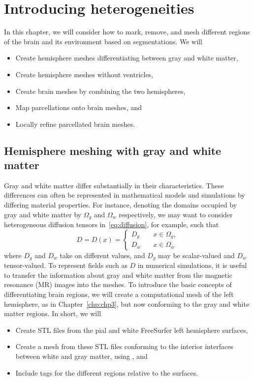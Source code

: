 \chapter{Introducing heterogeneities}
\label{chp:chp4}

In this chapter, we will consider how to mark, remove, and mesh
different regions of the brain and its environment based on
{\freesurfer} segmentations. We will
\begin{itemize}
\item
  Create hemisphere meshes differentiating between gray and white matter,
\item
  Create hemisphere meshes without ventricles,
\item
  Create brain meshes by combining the two hemispheres,
\item
  Map parcellations onto brain meshes, and
\item
  Locally refine parcellated brain meshes.
\end{itemize}

\section{Hemisphere meshing with gray and white matter}
\label{sec:chp4:tools:gray-white}

Gray and white matter differ substantially in their
characteristics. These differences can often be represented in
mathematical models and simulations by differing material
properties. For instance, denoting the domains occupied by gray and
white matter by $\Omega_g$ and $\Omega_w$ respectively, we may want to
consider heterogeneous diffusion tensors in~\eqref{eq:diffusion}, for
example, such that
\begin{equation}
  \label{eq:K}
  D = D(x) = \left \{
    \begin{matrix}
      D_g & \quad x \in \Omega_g, \\
      D_w & \quad x \in \Omega_w 
    \end{matrix}
    \right .
\end{equation}
where $D_g$ and $D_w$ take on different values, and $D_g$ may be
scalar-valued and $D_w$ tensor-valued. To represent fields such as $D$
in numerical simulations, it is useful to transfer the information
about gray and white matter from the magnetic resonance (MR) images
into the meshes. To introduce the basic concepts of differentiating
brain regions, we will create a computational mesh of the left
hemisphere, as in Chapter~\ref{chp:chp3}, but now conforming to the
gray and white matter regions. In short, we will
\begin{itemize}
\item
  Create STL files from the pial and white FreeSurfer left hemisphere
  surfaces, 
\item
  Create a mesh from these STL files conforming to the interior interfaces
  between white and gray matter, using \svmtk{}, and
\item
  Include tags for the different regions relative to the surfaces.
\end{itemize}


